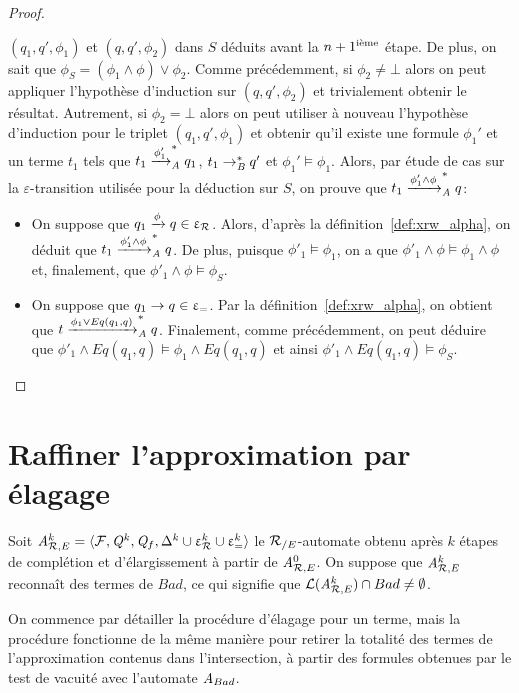\begin{proof}
\begin{itemize}
\begin{itemize}
    $(q_1,q',\phi_1)$ et $(q,q',\phi_2)$ dans $S$ déduits avant la $n+1^\iem$
    étape. De plus, on sait que $\phi_S=(\phi_1 \wedge \phi) \vee \phi_2$.
    Comme précédemment, si $\phi_2 \neq \bot$ alors on peut appliquer l'hypothèse d'induction
    sur $(q,q',\phi_2)$ et trivialement obtenir le résultat. Autrement, si $\phi_2=\bot$
    alors on peut utiliser à nouveau l'hypothèse d'induction pour le triplet $(q_1,q',\phi_1)$ et
    obtenir qu'il existe une formule $\phi_1'$ et un terme $t_1$ tels que
    $t_1\xrw{\phi_1'}_\A^* q_1$, $t_1 \rwB^* q'$ et $\phi_1' \models \phi_1$.
    Alors, par étude de cas sur la  $\varepsilon$-transition utilisée pour la déduction sur $S$, on 
    prouve que $t_1 \xrw{\phi_1'\wedge \phi}_\A^* q$:

    \begin{itemize}
    \item On suppose que $q_1 \xrw{\phi} q \in \Drw$. Alors, d'après la
      définition~\ref{def:xrw_alpha}, on déduit que $t_1 \xrw{\phi'_1
        \wedge \phi}_\A^* q$. De plus, puisque $\phi'_1 \models \phi_1$, on a que
      $\phi'_1 \wedge \phi \models \phi_1 \wedge \phi$ et, finalement, que
      $\phi'_1 \wedge \phi \models \phi_S$.

    \item On suppose que $q_1 \rw q \in \Deq$. Par
      la définition~\ref{def:xrw_alpha}, on obtient que $t \xrw{\phi_1 \lor Eq(q_1, q)}_\A^* q$.
      Finalement, comme précédemment, on peut déduire que
      $\phi'_1 \wedge Eq(q_1,q) \models \phi_1 \wedge Eq(q_1,q)$ et ainsi $\phi'_1 \wedge
      Eq(q_1,q) \models \phi_S$.
    \end{itemize}
  \end{itemize}
\end{itemize}
\end{proof}


\section{Raffiner l'approximation par élagage}
\label{sec:refinement}


Soit $\aaexeq^k = \la \F, \Q^k, \Q_f, \Delta^k \cup \Drw^k \cup \Deq^k
\ra$ le $\RE$-automate obtenu après $k$ étapes de complétion et d'élargissement
à partir de $\aaexeq^0$. On suppose que $\aaexeq^k$ reconnaît des termes de $Bad$,
ce qui signifie que $\Lang(\aaexeq^k) \cap Bad \not=\emptyset$. 

On commence par détailler la procédure d'élagage pour un terme, 
mais la procédure fonctionne de la même manière pour retirer la totalité 
des termes de l'approximation contenus dans l'intersection, à partir des
formules obtenues par le test de vacuité avec l'automate $\A_{Bad}$.


